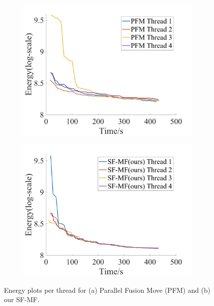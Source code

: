 \begin{figure}[!h]
  \centering
  \begin{subfigure}[b]{0.49\columnwidth}
    \centering
    \includegraphics[width=\columnwidth]{figure/optical_flow_PFM_threads.png}
    \caption{}
    \label{fig:optical_flow_PFM_threads}
  \end{subfigure}  
  \begin{subfigure}[b]{0.49\columnwidth}
    \centering
    \includegraphics[width=\columnwidth]{figure/optical_flow_SF_MF_threads.png}
    \caption{}
    \label{fig:optical_flow_SF_MF_threads}
  \end{subfigure}
  \caption{Energy plots per thread for (a) Parallel Fusion  
    Move (PFM) and (b) our SF-MF.}
  \label{fig:optical_flow_by_threads}  
\end{figure}

